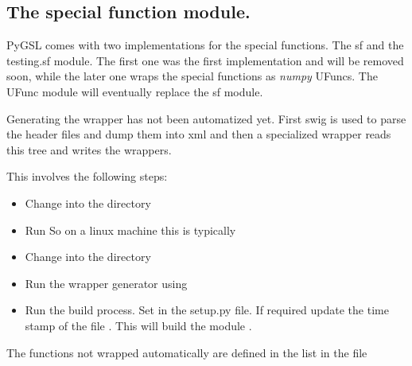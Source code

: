 \subsection{The special function module.}
    
  PyGSL comes with two implementations for the special functions. The sf and
  the testing.sf module. The first one was the first implementation and will be removed soon,
  while the
  later one wraps the special functions as \emph{numpy}
  UFuncs. The UFunc module will eventually replace the sf module.

  Generating the wrapper has not been automatized yet. First swig is used to 
  parse the header files and dump them into xml and then a specialized wrapper
  reads this tree and writes the wrappers.

  This involves the following steps:
  \begin{itemize}
  \item 
    Change into the directory 
  \item
    Run 
    So on a linux machine this is typically	 
  \item
    Change into the directory 
  \item
    Run the wrapper generator using 
    
  \item
   Run the build process. Set  in the
   setup.py file. If required update the time stamp of the file 
   . This will build the module
   .
  \end{itemize}
  The functions not wrapped automatically are defined in the list
  	in the file 


